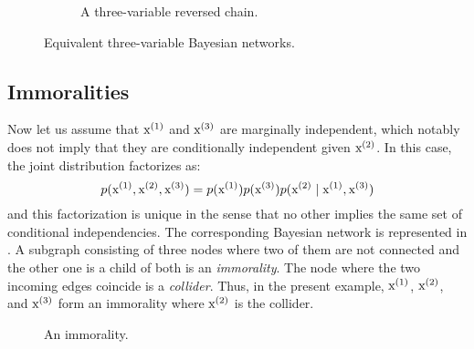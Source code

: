\begin{figure}
\begin{subfigure}[t]{0.32\textwidth}
{}
        \caption{A three-variable reversed chain.}
        \label{fig:revchain_bayesian_net}
    \end{subfigure}
    \caption{Equivalent three-variable Bayesian networks.}
    \label{fig:equiv_bayesian_nets}
\end{figure}

\subsection{Immoralities}
\label{sec:immoralities}
Now let us assume that ${\textnormal{x}}^{(1)}$ and ${\textnormal{x}}^{(3)}$ are marginally independent, which notably does not imply that they are conditionally independent given ${\textnormal{x}}^{(2)}$. In this case, the joint distribution factorizes as:
\begin{equation}
    p({\textnormal{x}}^{(1)}, {\textnormal{x}}^{(2)}, {\textnormal{x}}^{(3)}) = p({\textnormal{x}}^{(1)}) p({\textnormal{x}}^{(3)}) p({\textnormal{x}}^{(2)} \mid {\textnormal{x}}^{(1)}, {\textnormal{x}}^{(3)})
\end{equation}
and this factorization is unique in the sense that no other implies the same set of conditional independencies. The corresponding Bayesian network is represented in . A subgraph consisting of three nodes where two of them are not  connected and the other one is a child of both is an \emph{immorality}. The node where the two incoming edges coincide is a \emph{collider}. Thus, in the present example, ${\textnormal{x}}^{(1)}$, ${\textnormal{x}}^{(2)}$, and ${\textnormal{x}}^{(3)}$ form an immorality where ${\textnormal{x}}^{(2)}$ is the collider.

\begin{figure}
    \centering
    \caption{An immorality.}
    \label{fig:immorality_bayesian_net}
\end{figure}

